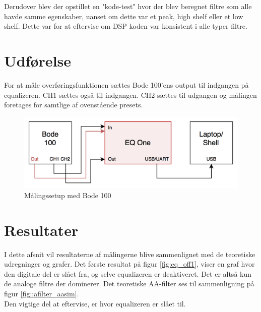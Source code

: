 Derudover blev der opstillet en "kode-test" hvor der blev beregnet filtre som alle havde samme egenskaber, uanset om dette var et peak, high shelf eller et low shelf. Dette var for at eftervise om DSP koden var konsistent i alle typer filtre. \\

\section{Udførelse}
For at måle overføringsfunktionen sættes Bode 100'ens output til indgangen på equalizeren. CH1 sættes også til indgangen. CH2 sættes til udgangen og målingen foretages for samtlige af ovenstående presets. \\


\begin{figure}[h!]\label{fig:bode_setup}
	\centering
	\includegraphics[width=13cm]{billeder/bode_setup}
	\caption{Målingssetup med Bode 100}
\end{figure}	

\FloatBlock

\section{Resultater}
I dette afsnit vil resultaterne af målingerne blive sammenlignet med de teoretiske udregninger og grafer.
Det første resultat på figur \ref{fig:eq_off1}, viser en graf hvor den digitale del er slået fra, og selve equalizeren er deaktiveret. Det er altså kun de analoge filtre der dominerer. Det teoretiske AA-filter ses til sammenligning på figur \ref{fig::afilter_aasim}. \\
Den vigtige del at eftervise, er hvor equalizeren er slået til. 








